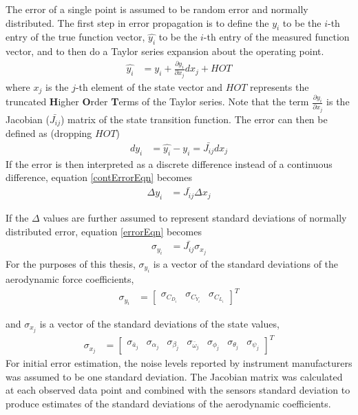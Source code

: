 \documentclass[12pt]{ucthesis}
\begin{document}
The error of a single point is assumed to be random error and normally distributed. The first step in error propagation is to define the $y_i$ to be the $i$-th entry of the true function vector, $\hat{y_i}$ to be the $i$-th entry of the measured function vector, and to then do a Taylor series expansion about the operating point.
\begin{align}
\hat{y_i} &= y_i + \frac{\partial{y_i}}{\partial{x_j}}dx_j+HOT
\end{align}
where $x_j$ is the $j$-th element of the state vector and $HOT$ represents the truncated  \textbf{H}igher \textbf{O}rder \textbf{T}erms of the Taylor series. Note that the term $\frac{\partial{y_i}}{\partial{x_j}}$ is the Jacobian ($\bar{J_{ij}}$) matrix of the state transition function. The error can then be defined as (dropping $HOT$)
\begin{align}
\label{contErrorEqn}
dy_i &= \hat{y_i}-y_i =  \bar{J_{ij}}dx_j
\end{align}
If the error is then interpreted as a discrete difference instead of a continuous difference, equation \ref{contErrorEqn} becomes
\begin{align}
\label{errorEqn}
\Delta y_i &= \bar{J_{ij}}\Delta x_j
\end{align}

If the $\Delta$ values are further assumed to represent standard deviations of normally distributed error, equation \ref{errorEqn} becomes
\begin{align}
\sigma_{y_i} &= \bar{J_{ij}} \sigma_{x_j}
\end{align}
For the purposes of this thesis, $\sigma_{y_i}$ is a vector of the standard deviations of the aerodynamic force coefficients,
\begin{align}
\sigma_{y_i} &= \begin{bmatrix} \sigma_{C_{D_i}} & \sigma_{C_{Y_i}} & \sigma_{C_{L_i}} \end{bmatrix}^T
\end{align}

and $\sigma_{x_j}$ is a vector of the standard deviations of the state values,
\begin{align}
\sigma_{x_j} &= \begin{bmatrix} \sigma_{\bar{a}_j} & \sigma_{\alpha_j} & \sigma_{\beta_j} & \sigma_{\bar{\omega}_j} & \sigma_{\phi_j} & \sigma_{\theta_j} & \sigma_{\psi_j}\end{bmatrix}^T
\end{align}
For initial error estimation, the noise levels reported by instrument manufacturers was assumed to be one standard deviation. The Jacobian matrix was calculated at each observed data point and combined with the sensors standard deviation to produce estimates of the standard deviations of the aerodynamic coefficients.
\end{document}
